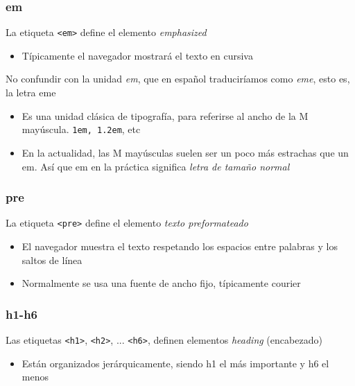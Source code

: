 \documentclass[ucs]{beamer}
\begin{document}
\begin{frame}[fragile]
\frametitle{em}
La etiqueta \verb|<em>| define el elemento \emph{emphasized}

\begin{itemize}
\item
Típicamente el navegador mostrará el texto en cursiva
\end{itemize}


No confundir con la unidad
\emph{em},
que en español traduciríamos como
\emph{eme},
esto es, la letra eme

    \begin{itemize}
    \item
 Es una unidad clásica de tipografía, para referirse al ancho de la M mayúscula. \verb|1em, 1.2em|, etc
    \item
En la actualidad, las M mayúsculas suelen ser un poco más
estrachas que un em.  Así que em en la práctica significa \emph{letra de tamaño normal}
    \end{itemize}



\end{frame}











\begin{frame}[fragile]
\frametitle{pre}
La etiqueta \verb|<pre>| define el elemento \emph{texto preformateado}
\begin{itemize}
\item
El navegador muestra el texto respetando los espacios entre palabras y los saltos
de línea

\item
Normalmente se usa una fuente de ancho fijo, típicamente
courier

\end{itemize}

\end{frame}


\begin{frame}[fragile]
\frametitle{h1-h6}
Las etiquetas 
\verb|<h1>|, 
\verb|<h2>|, 
...
\verb|<h6>|, 
definen elementos 
\emph{heading}
(encabezado)
\begin{itemize}
\item
Están organizados jerárquicamente, siendo h1 el más importante y h6 el menos
\end{itemize}

\end{frame}
\end{document}
